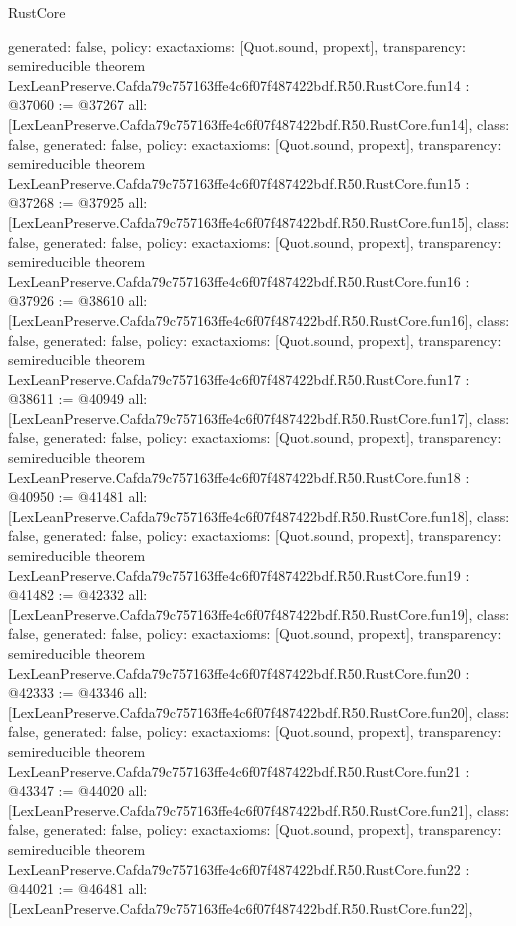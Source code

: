 \begin{lexlean}{RustCore}
\begin{coremodule}
{  generated: false,
  policy: exact{axioms: [Quot.sound, propext]},
  transparency: semireducible
}
theorem LexLeanPreserve.Cafda79c757163ffe4c6f07f487422bdf.R50.RustCore.fun14 : @37060 := @37267 {
  all: [LexLeanPreserve.Cafda79c757163ffe4c6f07f487422bdf.R50.RustCore.fun14],
  class: false,
  generated: false,
  policy: exact{axioms: [Quot.sound, propext]},
  transparency: semireducible
}
theorem LexLeanPreserve.Cafda79c757163ffe4c6f07f487422bdf.R50.RustCore.fun15 : @37268 := @37925 {
  all: [LexLeanPreserve.Cafda79c757163ffe4c6f07f487422bdf.R50.RustCore.fun15],
  class: false,
  generated: false,
  policy: exact{axioms: [Quot.sound, propext]},
  transparency: semireducible
}
theorem LexLeanPreserve.Cafda79c757163ffe4c6f07f487422bdf.R50.RustCore.fun16 : @37926 := @38610 {
  all: [LexLeanPreserve.Cafda79c757163ffe4c6f07f487422bdf.R50.RustCore.fun16],
  class: false,
  generated: false,
  policy: exact{axioms: [Quot.sound, propext]},
  transparency: semireducible
}
theorem LexLeanPreserve.Cafda79c757163ffe4c6f07f487422bdf.R50.RustCore.fun17 : @38611 := @40949 {
  all: [LexLeanPreserve.Cafda79c757163ffe4c6f07f487422bdf.R50.RustCore.fun17],
  class: false,
  generated: false,
  policy: exact{axioms: [Quot.sound, propext]},
  transparency: semireducible
}
theorem LexLeanPreserve.Cafda79c757163ffe4c6f07f487422bdf.R50.RustCore.fun18 : @40950 := @41481 {
  all: [LexLeanPreserve.Cafda79c757163ffe4c6f07f487422bdf.R50.RustCore.fun18],
  class: false,
  generated: false,
  policy: exact{axioms: [Quot.sound, propext]},
  transparency: semireducible
}
theorem LexLeanPreserve.Cafda79c757163ffe4c6f07f487422bdf.R50.RustCore.fun19 : @41482 := @42332 {
  all: [LexLeanPreserve.Cafda79c757163ffe4c6f07f487422bdf.R50.RustCore.fun19],
  class: false,
  generated: false,
  policy: exact{axioms: [Quot.sound, propext]},
  transparency: semireducible
}
theorem LexLeanPreserve.Cafda79c757163ffe4c6f07f487422bdf.R50.RustCore.fun20 : @42333 := @43346 {
  all: [LexLeanPreserve.Cafda79c757163ffe4c6f07f487422bdf.R50.RustCore.fun20],
  class: false,
  generated: false,
  policy: exact{axioms: [Quot.sound, propext]},
  transparency: semireducible
}
theorem LexLeanPreserve.Cafda79c757163ffe4c6f07f487422bdf.R50.RustCore.fun21 : @43347 := @44020 {
  all: [LexLeanPreserve.Cafda79c757163ffe4c6f07f487422bdf.R50.RustCore.fun21],
  class: false,
  generated: false,
  policy: exact{axioms: [Quot.sound, propext]},
  transparency: semireducible
}
theorem LexLeanPreserve.Cafda79c757163ffe4c6f07f487422bdf.R50.RustCore.fun22 : @44021 := @46481 {
  all: [LexLeanPreserve.Cafda79c757163ffe4c6f07f487422bdf.R50.RustCore.fun22],
}
\end{coremodule}
\end{lexlean}
